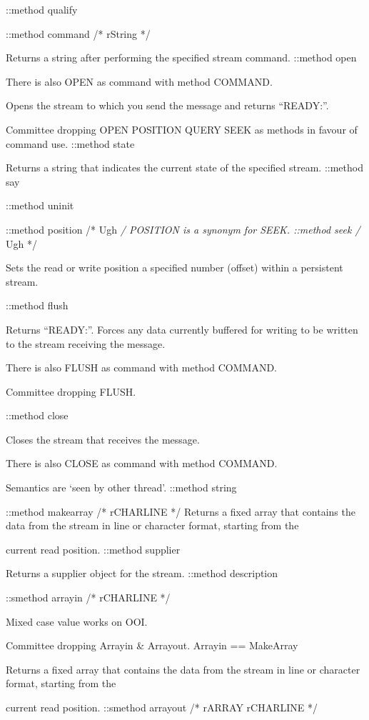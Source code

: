 ::method qualify

::method command /* rString */

Returns a string after performing the specified stream command. ::method
open

There is also OPEN as command with method COMMAND.

Opens the stream to which you send the message and returns ``READY:''.

Committee dropping OPEN POSITION QUERY SEEK as methods in favour of
command use. ::method state

Returns a string that indicates the current state of the specified
stream. ::method say

::method uninit

::method position /* Ugh \emph{/ POSITION is a synonym for SEEK.
::method seek /} Ugh */

Sets the read or write position a specified number (offset) within a
persistent stream.

::method flush

Returns ``READY:''. Forces any data currently buffered for writing to be
written to the stream receiving the message.

There is also FLUSH as command with method COMMAND.

Committee dropping FLUSH.

::method close

Closes the stream that receives the message.

There is also CLOSE as command with method COMMAND.

Semantics are `seen by other thread'. ::method string

::method makearray /* rCHARLINE */ Returns a fixed array that contains
the data from the stream in line or character format, starting from the

current read position. ::method supplier

Returns a supplier object for the stream. ::method description

::smethod arrayin /* rCHARLINE */

Mixed case value works on OOI.

Committee dropping Arrayin \& Arrayout. Arrayin == MakeArray

Returns a fixed array that contains the data from the stream in line or
character format, starting from the

current read position. ::smethod arrayout /* rARRAY rCHARLINE */

